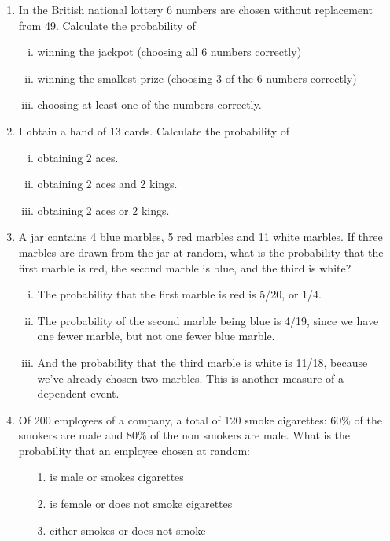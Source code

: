 \documentclass[]{report}
\begin{document}
\begin{enumerate}[(1)]
\item In the British national lottery 6 numbers are chosen without replacement from 49. Calculate the probability of 
\begin{enumerate}[(i)]
\item winning the jackpot (choosing all 6 numbers correctly)
\item winning the smallest prize (choosing 3 of the 6 numbers correctly)
\item choosing at least one of the numbers correctly.
\end{enumerate}	

\item	I obtain a hand of 13 cards. Calculate the probability of
\begin{enumerate}[(i)]
\item obtaining 2 aces.
\item obtaining 2 aces and 2 kings.
\item obtaining 2 aces or 2 kings.
\end{enumerate}	


\item A jar contains 4 blue marbles, 5 red marbles and 11 white marbles. If three marbles are drawn from the jar at random, what is the probability that the first marble is red, the second marble is blue, and the third is white?
\begin{enumerate}[(i)]
	\item The probability that the first marble is red is 5/20, or 1/4. 
	\item The probability of the second marble being blue is 4/19, since we have one fewer marble, but not one fewer blue marble. 
	\item And the probability that the third marble is white is 11/18, because we've already chosen two marbles. This is another measure of a dependent event.
\end{enumerate}

\item 
Of 200 employees of a company, a total of 120 smoke cigarettes:
60\% of the smokers are male and 80\% of the non smokers are
male. What is the probability that an employee chosen at random:
\begin{itemize}
	\item[1.]  is male or smokes cigarettes
	\item[2.] is female or does not smoke cigarettes
	\item[3.] either smokes or does not smoke
\end{itemize}


\end{enumerate}
\end{document}

